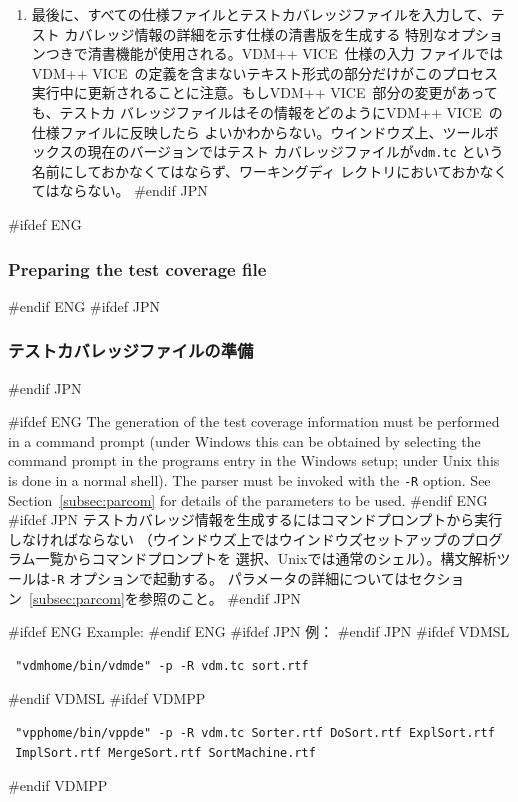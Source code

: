 \documentclass[\pformat,12pt]{article}
\newcommand{\vdmslpp}{VDM-SL}
\newcommand{\vdmslpp}{VDM++}
\renewcommand{\vdmslpp}{VDM++ VICE}
\begin{document}
\begin{enumerate}
\item
  最後に、すべての仕様ファイルとテストカバレッジファイルを入力して、テスト
  カバレッジ情報の詳細を示す仕様の清書版を生成する
  特別なオプションつきで清書機能が使用される。\vdmslpp\ 仕様の入力
  ファイルでは\vdmslpp\ の定義を含まないテキスト形式の部分だけがこのプロセス
  実行中に更新されることに注意。もし\vdmslpp\ 部分の変更があっても、テストカ
  バレッジファイルはその情報をどのように\vdmslpp\ の仕様ファイルに反映したら
  よいかわからない。ウインドウズ上、ツールボックスの現在のバージョンではテスト
  カバレッジファイルが\texttt{vdm.tc} という名前にしておかなくてはならず、ワーキングディ
  レクトリにおいておかなくてはならない。
#endif JPN

\end{enumerate}


#ifdef ENG
\subsubsection{Preparing the test coverage file}
#endif ENG
#ifdef JPN
\subsubsection{テストカバレッジファイルの準備}
#endif JPN

#ifdef ENG
The generation of the test coverage information must be performed in a
command prompt (under Windows this can be obtained by selecting the
command prompt in the programs entry in the Windows setup; under
Unix this is done in a normal shell). The parser must be invoked with
 the {\tt -R} option. See
Section~\ref{subsec:parcom} for details of the parameters to be used.
#endif ENG
#ifdef JPN
テストカバレッジ情報を生成するにはコマンドプロンプトから実行しなければならない
（ウインドウズ上ではウインドウズセットアップのプログラム一覧からコマンドプロンプトを
選択、Unixでは通常のシェル）。構文解析ツールは{\tt -R} オプションで起動する。
パラメータの詳細についてはセクション~\ref{subsec:parcom}を参照のこと。
#endif JPN

#ifdef ENG
Example:
#endif ENG
#ifdef JPN
例：
#endif JPN
#ifdef VDMSL
\begin{verbatim}
 "vdmhome/bin/vdmde" -p -R vdm.tc sort.rtf
\end{verbatim}
#endif VDMSL
#ifdef VDMPP
\begin{verbatim}
 "vpphome/bin/vppde" -p -R vdm.tc Sorter.rtf DoSort.rtf ExplSort.rtf
 ImplSort.rtf MergeSort.rtf SortMachine.rtf
\end{verbatim}
#endif VDMPP
\end{document}
